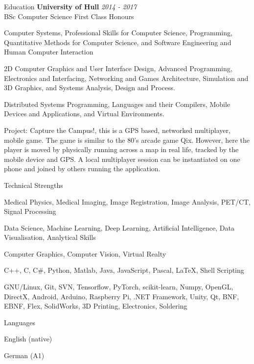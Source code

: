 \documentclass{cv}
\begin{document}
\begin{rSection}{Education}
        {\bf University of Hull} \hfill {\em 2014 - 2017} 
        \\ BSc Computer Science \hfill {First Class Honours}
        
        \item Computer Systems, Professional Skills for Computer Science, Programming, Quantitative Methods for Computer Science, and Software Engineering and Human Computer Interaction
        
        \item 2D Computer Graphics and User Interface Design, Advanced Programming, Electronics and Interfacing, Networking and Games Architecture, Simulation and 3D Graphics, and Systems Analysis, Design and Process.
        
        \item Distributed Systems Programming, Languages and their Compilers, Mobile Devices and Applications, and Virtual Environments.
        
        \item Project: Capture the Campus!, this is a GPS based, networked multiplayer, mobile game. The game is similar to the 80's arcade game Qix. However, here the player is moved by physically running across a map in real life, tracked by the mobile device and GPS. A local multiplayer session can be instantiated on one phone and joined by others running the application.
    \end{rSection}

    \begin{rSection}{Technical Strengths}
        \item Medical Physics, Medical Imaging, Image Registration, Image Analysis, PET/CT, Signal Processing
        \item Data Science, Machine Learning, Deep Learning, Artificial Intelligence, Data Visualisation, Analytical Skills
        \item Computer Graphics, Computer Vision, Virtual Realty
        \item C++, C, C\#, Python, Matlab, Java, JavaScript, Pascal, LaTeX, Shell Scripting
        \item GNU/Linux, Git, SVN, Tensorflow, PyTorch, scikit-learn, Numpy, OpenGL, DirectX, Android, Arduino, Raspberry Pi, .NET Framework, Unity, Qt, BNF, EBNF, Flex, SolidWorks, 3D Printing, Electronics, Soldering 
    \end{rSection}

    \begin{rSection}{Languages}
        \item English (native)
        \item German (A1)
    \end{rSection}
\end{document}
